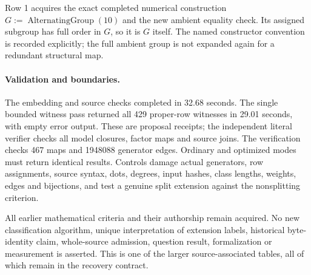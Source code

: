 \documentclass[11pt]{article}
\begin{document}
Row 1 acquires the exact completed numerical construction
$G:=\operatorname{AlternatingGroup}(10)$ and the new ambient equality check.
Its assigned subgroup has full order in $G$, so it is $G$ itself. The named
constructor convention is recorded explicitly; the full ambient group is
not expanded again for a redundant structural map.

\paragraph{Validation and boundaries.}
The embedding and source checks completed in 32.68 seconds. The single
bounded witness pass returned all 429 proper-row witnesses in 29.01 seconds,
with empty error output. These are proposal receipts; the independent
literal verifier checks all model closures, factor maps and source joins.
The verification checks 467 maps and 1948088 generator edges.
Ordinary and optimized modes must return identical results. Controls damage
actual generators, row assignments, source syntax, dots, degrees, input
hashes, class lengths, weights, edges and bijections, and test a genuine
split extension against the nonsplitting criterion.

All earlier mathematical criteria and their authorship remain acquired.
No new classification algorithm, unique interpretation of extension labels,
historical byte-identity claim, whole-source admission, question result,
formalization or measurement is asserted. This is one of the larger
source-associated tables, all of which remain in the recovery contract.
\end{document}
